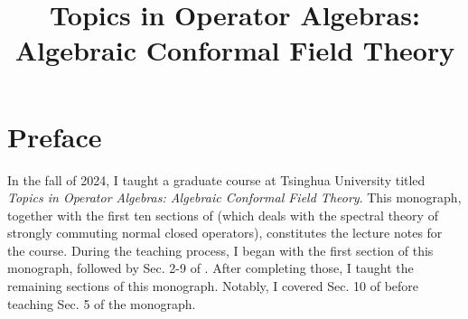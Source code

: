 \documentclass[12pt,b5paper,notitlepage]{article}
\title{Topics in Operator Algebras: Algebraic Conformal Field Theory}
\author{\sc{ Bin Gui}
}
\date{}
\theoremstyle{definition}
\theoremstyle{plain}
\numberwithin{equation}{section}
\begin{document}
\sloppy %
	\setcounter{page}{1}
	\setcounter{section}{-1}



	









	
	\maketitle












	


\normalsize


\tableofcontents


\newpage

\section*{Preface}

In the fall of 2024, I taught a graduate course at Tsinghua University titled \textit{Topics in Operator Algebras: Algebraic Conformal Field Theory}. This monograph, together with the first ten sections of \cite{Gui-S} (which deals with the spectral theory of strongly commuting normal closed operators), constitutes the lecture notes for the course.  During the teaching process, I began with the first section of this monograph, followed by Sec. 2-9 of \cite{Gui-S}. After completing those, I taught the remaining sections of this monograph. Notably, I covered Sec. 10 of \cite{Gui-S} before teaching Sec. 5 of the monograph.
\end{document}

